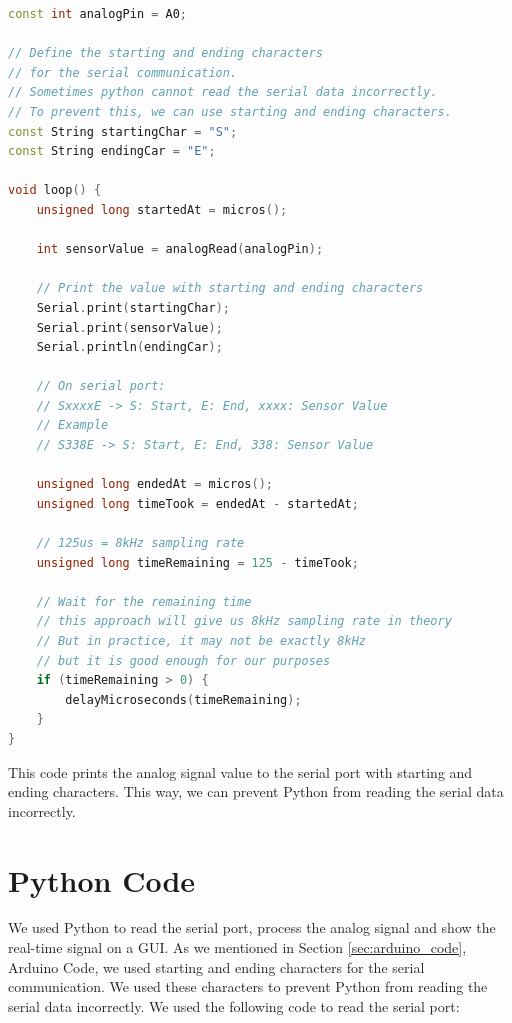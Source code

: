 \begin{lstlisting}[language=C++, caption=Arduino Code with Start and End Characters, label=lst:arduino_code_start_end]
const int analogPin = A0;

// Define the starting and ending characters 
// for the serial communication. 
// Sometimes python cannot read the serial data incorrectly. 
// To prevent this, we can use starting and ending characters.
const String startingChar = "S";
const String endingCar = "E";

void loop() {
    unsigned long startedAt = micros();

    int sensorValue = analogRead(analogPin);
    
    // Print the value with starting and ending characters
    Serial.print(startingChar);
    Serial.print(sensorValue);
    Serial.println(endingCar);

    // On serial port: 
    // SxxxxE -> S: Start, E: End, xxxx: Sensor Value
    // Example
    // S338E -> S: Start, E: End, 338: Sensor Value

    unsigned long endedAt = micros();
    unsigned long timeTook = endedAt - startedAt;

    // 125us = 8kHz sampling rate
    unsigned long timeRemaining = 125 - timeTook;

    // Wait for the remaining time
    // this approach will give us 8kHz sampling rate in theory
    // But in practice, it may not be exactly 8kHz 
    // but it is good enough for our purposes
    if (timeRemaining > 0) {
        delayMicroseconds(timeRemaining);
    }
}
\end{lstlisting}

This code prints the analog signal value to the serial port with starting and ending characters. This way, we can prevent Python from reading the serial data incorrectly.

\newpage
\thispagestyle{plain}

\section{Python Code}

We used Python to read the serial port, process the analog signal and show the real-time signal on a GUI. As we mentioned in Section \ref{sec:arduino_code}, Arduino Code, we used starting and ending characters for the serial communication. We used these characters to prevent Python from reading the serial data incorrectly. We used the following code to read the serial port:

